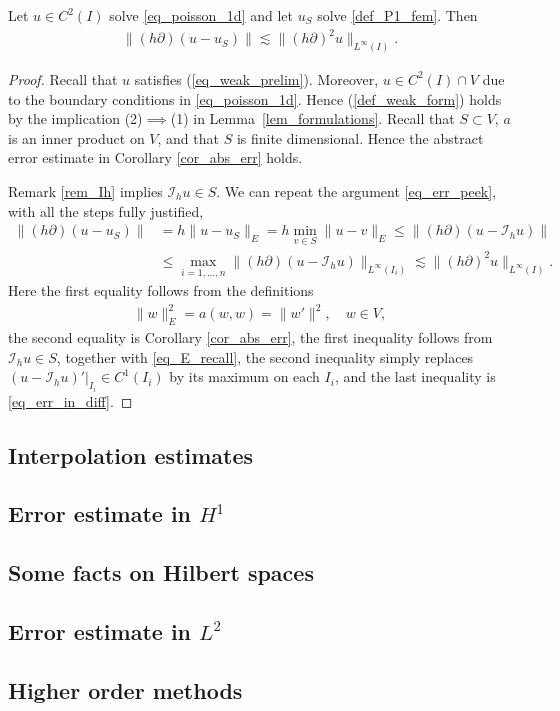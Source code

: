 \documentclass[12pt,oneside]{amsart}
\def\I{\mathcal I}
\begin{document}
\begin{proposition}
Let $u \in C^2(I)$ solve \eqref{eq_poisson_1d}
and let $u_S$ solve \eqref{def_P1_fem}.
Then
    \begin{align*}
\|(h\partial)(u-u_S)\|
\lesssim
\|(h \partial)^2 u\|_{L^\infty(I)}.
    \end{align*}
\end{proposition}
\begin{proof}
Recall that $u$ satisfies (\ref{eq_weak_prelim}).
Moreover, $u \in C^2(I) \cap V$ due to the boundary conditions in \eqref{eq_poisson_1d}. Hence (\ref{def_weak_form}) holds by the implication (2)$\implies$(1) in Lemma~\ref{lem_formulations}.
Recall that $S \subset V$,
$a$ is an inner product on $V$, and that $S$ is finite dimensional. 
Hence the abstract error estimate in Corollary \ref{cor_abs_err} holds.

Remark \ref{rem_Ih} implies $\I_h u \in S$. We can repeat the argument \eqref{eq_err_peek}, with all the steps fully justified,
    \begin{align*}
\|(h\partial)(u-u_S)\|
&= 
h\|u-u_S\|_E 
= 
h \min_{v \in S}\|u-v\|_E
\le 
\|(h\partial)(u-\I_h u)\|
\\&\le
\max_{i=1,\dots,n}\|(h\partial)(u - \I_h u)\|_{L^\infty(I_i)} 
\lesssim
\|(h \partial)^2 u\|_{L^\infty(I)}.
    \end{align*}
Here the first equality follows from the definitions 
    \begin{align}\label{eq_E_recall}
\|w\|_E^2 = a(w,w) = \|w'\|^2, \quad w \in V,
    \end{align}
the second equality is Corollary \ref{cor_abs_err},
the first inequality follows from $\I_h u \in S$, together with \eqref{eq_E_recall}, 
the second inequality simply replaces $(u - \I_h u)'|_{I_i} \in C^1(I_i)$ by its maximum on each $I_i$, and the last inequality is \eqref{eq_err_in_diff}.
\end{proof}


\subsection{Interpolation estimates}

\subsection{Error estimate in $H^1$}

\subsection{Some facts on Hilbert spaces}

\subsection{Error estimate in $L^2$}

\subsection{Higher order methods}



\end{document}
